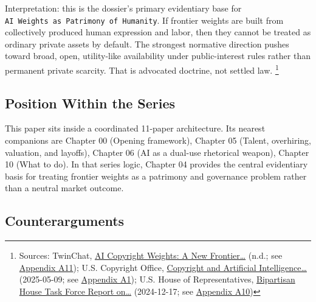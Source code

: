 \documentclass[
  american,
  11pt,
  letterpaper,
]{article}
\begin{document}
Interpretation: this is the dossier's primary evidentiary base for
\texttt{AI\ Weights\ as\ Patrimony\ of\ Humanity}. If frontier weights
are built from collectively produced human expression and labor, then
they cannot be treated as ordinary private assets by default. The
strongest normative direction pushes toward broad, open, utility-like
availability under public-interest rules rather than permanent private
scarcity. That is advocated doctrine, not settled law. \footnote{Sources:
  TwinChat,
  \href{https://medium.com/twinchat/ai-copyright-weights-a-new-frontier-in-intellectual-property-law-d8ee1b6c55ee}{AI
  Copyright Weights: A New Frontier\ldots{}} (n.d.; see
  \hyperref[ch-04-appendix-a11-ai-copyright-weights-a-new-frontier-in-intellectual-property-law]{Appendix
  A11}); U.S. Copyright Office,
  \href{https://copyright.gov/ai/Copyright-and-Artificial-Intelligence-Part-3-Generative-AI-Training-Report-Pre-Publication-Version.pdf}{Copyright
  and Artificial Intelligence\ldots{}} (2025-05-09; see
  \hyperref[ch-04-appendix-a1-copyright-and-artificial-intelligence-part-3-generative-ai-training-pre-publication-version]{Appendix
  A1}); U.S. House of Representatives,
  \href{https://www.speaker.gov/wp-content/uploads/2024/12/AI-Task-Force-Report-FINAL.pdf}{Bipartisan
  House Task Force Report on\ldots{}} (2024-12-17; see
  \hyperref[ch-04-appendix-a10-bipartisan-house-task-force-report-on-artificial-intelligence]{Appendix
  A10})}

\subsection{Position Within the
Series}\label{position-within-the-series-4}

This paper sits inside a coordinated 11-paper architecture. Its nearest
companions are Chapter 00 (Opening framework), Chapter 05 (Talent,
overhiring, valuation, and layoffs), Chapter 06 (AI as a dual-use
rhetorical weapon), Chapter 10 (What to do). In that series logic,
Chapter 04 provides the central evidentiary basis for treating frontier
weights as a patrimony and governance problem rather than a neutral
market outcome.

\subsection{Counterarguments}\label{counterarguments-4}
\end{document}
